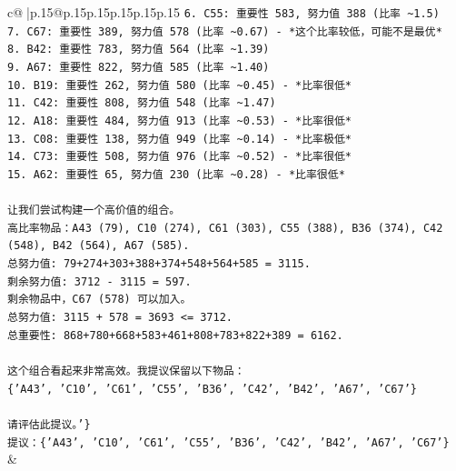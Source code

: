 \documentclass{article}
\begin{document}
{\begin{supertabular}{c@{$\;$}|p{.15\linewidth}@{}p{.15\linewidth}p{.15\linewidth}p{.15\linewidth}p{.15\linewidth}p{.15\linewidth}}
{{{\texttt{6. C55: 重要性 583, 努力值 388 (比率 \textasciitilde{}1.5)} \\
\texttt{7. C67: 重要性 389, 努力值 578 (比率 \textasciitilde{}0.67) {-} *这个比率较低，可能不是最优*} \\
\texttt{8. B42: 重要性 783, 努力值 564 (比率 \textasciitilde{}1.39)} \\
\texttt{9. A67: 重要性 822, 努力值 585 (比率 \textasciitilde{}1.40)} \\
\texttt{10. B19: 重要性 262, 努力值 580 (比率 \textasciitilde{}0.45) {-} *比率很低*} \\
\texttt{11. C42: 重要性 808, 努力值 548 (比率 \textasciitilde{}1.47)} \\
\texttt{12. A18: 重要性 484, 努力值 913 (比率 \textasciitilde{}0.53) {-} *比率很低*} \\
\texttt{13. C08: 重要性 138, 努力值 949 (比率 \textasciitilde{}0.14) {-} *比率极低*} \\
\texttt{14. C73: 重要性 508, 努力值 976 (比率 \textasciitilde{}0.52) {-} *比率很低*} \\
\texttt{15. A62: 重要性 65, 努力值 230 (比率 \textasciitilde{}0.28) {-} *比率很低*} \\
\\ 
\texttt{让我们尝试构建一个高价值的组合。} \\
\texttt{高比率物品：A43 (79), C10 (274), C61 (303), C55 (388), B36 (374), C42 (548), B42 (564), A67 (585).} \\
\texttt{总努力值: 79+274+303+388+374+548+564+585 = 3115.} \\
\texttt{剩余努力值: 3712 {-} 3115 = 597.} \\
\texttt{剩余物品中，C67 (578) 可以加入。} \\
\texttt{总努力值: 3115 + 578 = 3693 <= 3712.} \\
\texttt{总重要性: 868+780+668+583+461+808+783+822+389 = 6162.} \\
\\ 
\texttt{这个组合看起来非常高效。我提议保留以下物品：} \\
\texttt{\{'A43', 'C10', 'C61', 'C55', 'B36', 'C42', 'B42', 'A67', 'C67'\}} \\
\\ 
\texttt{请评估此提议。'\}} \\
\texttt{提议：\{'A43', 'C10', 'C61', 'C55', 'B36', 'C42', 'B42', 'A67', 'C67'\}} \\
            }
        }
    }
    & \\ \\


\end{supertabular}}
\end{document}
